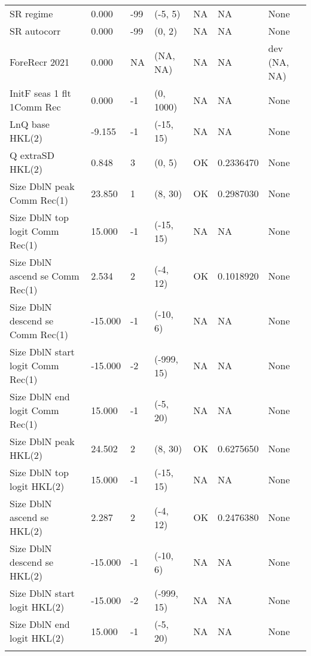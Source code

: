 \documentclass[11pt,
  english,
  a4paper,
]{article}
\begin{document}
\begin{landscape}
\begin{longtable}[t]{>{\raggedright\arraybackslash}p{6cm}lllll>{\raggedright\arraybackslash}p{4cm}}
SR regime & 0.000 & -99 & (-5, 5) & NA & NA & None\\
SR autocorr & 0.000 & -99 & (0, 2) & NA & NA & None\\
ForeRecr 2021 & 0.000 & NA & (NA, NA) & NA & NA & dev (NA, NA)\\
InitF seas 1 flt 1Comm Rec & 0.000 & -1 & (0, 1000) & NA & NA & None\\
LnQ base HKL(2) & -9.155 & -1 & (-15, 15) & NA & NA & None\\
Q extraSD HKL(2) & 0.848 & 3 & (0, 5) & OK & 0.2336470 & None\\
Size DblN peak Comm Rec(1) & 23.850 & 1 & (8, 30) & OK & 0.2987030 & None\\
Size DblN top logit Comm Rec(1) & 15.000 & -1 & (-15, 15) & NA & NA & None\\
Size DblN ascend se Comm Rec(1) & 2.534 & 2 & (-4, 12) & OK & 0.1018920 & None\\
Size DblN descend se Comm Rec(1) & -15.000 & -1 & (-10, 6) & NA & NA & None\\
Size DblN start logit Comm Rec(1) & -15.000 & -2 & (-999, 15) & NA & NA & None\\
Size DblN end logit Comm Rec(1) & 15.000 & -1 & (-5, 20) & NA & NA & None\\
Size DblN peak HKL(2) & 24.502 & 2 & (8, 30) & OK & 0.6275650 & None\\
Size DblN top logit HKL(2) & 15.000 & -1 & (-15, 15) & NA & NA & None\\
Size DblN ascend se HKL(2) & 2.287 & 2 & (-4, 12) & OK & 0.2476380 & None\\
Size DblN descend se HKL(2) & -15.000 & -1 & (-10, 6) & NA & NA & None\\
Size DblN start logit HKL(2) & -15.000 & -2 & (-999, 15) & NA & NA & None\\
Size DblN end logit HKL(2) & 15.000 & -1 & (-5, 20) & NA & NA & None\\*
\end{longtable}
\endgroup{}
\end{landscape}
\endgroup{}





\newpage

\newpage



\newpage

\begingroup\fontsize{10}{12}\selectfont
\end{document}
